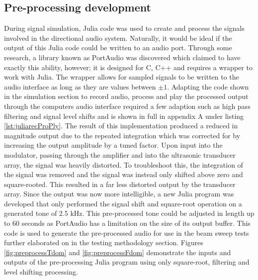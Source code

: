 \subsection{Pre-processing development}
During signal simulation, Julia code was used to create and process the signals involved in the directional audio system. Naturally, it would be ideal if the output of this Julia code could be written to an audio port. Through some research, a library known as PortAudio was discovered which claimed to have exactly this ability, however; it is designed for C, C++ and requires a wrapper to work with Julia. The wrapper \cite{russell_2016} allows for sampled signals to be written to the audio interface as long as they are values between $\pm1$. Adapting the code shown in the simulation section to record audio, process and play the processed output through the computers audio interface required a few adaption such as high pass filtering and signal level shifts and is shown in full in appendix A under listing \ref{lst:juliarecProPly}.
The result of this implementation produced a reduced in magnitude output due to the repeated integration which was corrected for by increasing the output amplitude by a tuned factor. Upon input into the modulator, passing through the amplifier and into the ultrasonic transducer array, the signal was heavily distorted. To troubleshoot this, the integration of the signal was removed and the signal was instead only shifted above zero and square-rooted. This resulted in a far less distorted output by the transducer array.
Since the output was now more intelligible, a new Julia program was developed that only performed the signal shift and square-root operation on a generated tone of 2.5 kHz. This pre-processed tone could be adjusted in length up to 60 seconds as PortAudio has a limitation on the size of its output buffer. This code is used to generate the pre-processed audio for use in the beam sweep tests further elaborated on in the testing methodology section.
Figures \ref{fig:preprocessTdom} and \ref{fig:preprocessFdom} demonstrate the inputs and outputs of the pre-processing Julia program using only square-root, filtering and level shifting processing.

